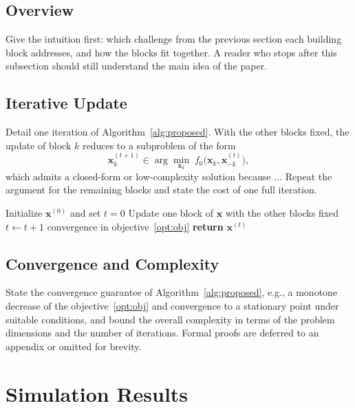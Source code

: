 \documentclass[conference]{IEEEtran}
\begin{document}
\subsection{Overview}
Give the intuition first: which challenge from the previous section each
building block addresses, and how the blocks fit together. A reader who
stops after this subsection should still understand the main idea of the
paper.

\subsection{Iterative Update}
Detail one iteration of Algorithm~\ref{alg:proposed}. With the other
blocks fixed, the update of block $k$ reduces to a subproblem of the form
\begin{equation}\label{eq:update}
\mathbf{x}_{k}^{(t+1)} \in \arg\min_{\mathbf{x}_{k}}\;
f_0\big(\mathbf{x}_{k}, \mathbf{x}_{-k}^{(t)}\big),
\end{equation}
which admits a closed-form or low-complexity solution because ...
Repeat the argument for the remaining blocks and state the cost of one
full iteration.

\begin{algorithm}[!t]
\caption{Proposed Algorithm}
\label{alg:proposed}
\begin{algorithmic}[1]
\STATE Initialize $\mathbf{x}^{(0)}$ and set $t = 0$
\REPEAT
\STATE Update one block of $\mathbf{x}$ with the other blocks fixed
\STATE $t \leftarrow t + 1$
\UNTIL convergence in objective~\eqref{opt:obj}
\STATE \textbf{return} $\mathbf{x}^{(t)}$
\end{algorithmic}
\end{algorithm}

\subsection{Convergence and Complexity}
State the convergence guarantee of Algorithm~\ref{alg:proposed}, e.g., a
monotone decrease of the objective~\eqref{opt:obj} and convergence to a
stationary point under suitable conditions, and bound the overall
complexity in terms of the problem dimensions and the number of
iterations. Formal proofs are deferred to an appendix or omitted for
brevity.

\section{Simulation Results}\label{sec:results}
\end{document}
